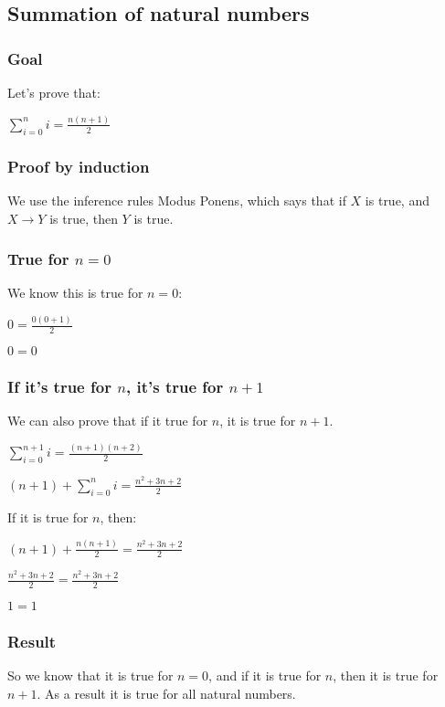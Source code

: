 
\subsection{Summation of natural numbers}


\subsubsection{Goal}

Let's prove that:

$\sum_{i=0}^n i= \frac{n(n+1)}{2}$

\subsubsection{Proof by induction}

We use the inference rules Modus Ponens, which says that if \(X\) is true, and \(X\rightarrow Y\) is true, then \(Y\) is true.

\subsubsection{True for \(n=0\)}

We know this is true for \(n=0\):

$0=\frac{0(0+1)}{2}$

$0=0$

\subsubsection{If it's true for \(n\), it's true for \(n+1\)}

We can also prove that if it true for \(n\), it is true for \(n+1\).

$\sum_{i=0}^{n+1} i= \frac{(n+1)(n+2)}{2}$

$(n+1)+\sum_{i=0}^{n} i= \frac{n^2 +3n +2}{2}$

If it is true for \(n\), then:

$(n+1)+\frac{n(n+1)}{2}= \frac{n^2 +3n +2}{2}$

$\frac{n^2+3n+2}{2}= \frac{n^2 +3n +2}{2}$

$1=1$

\subsubsection{Result}

So we know that it is true for \(n=0\), and if it is true for \(n\), then it is true for \(n+1\). As a result it is true for all natural numbers.

